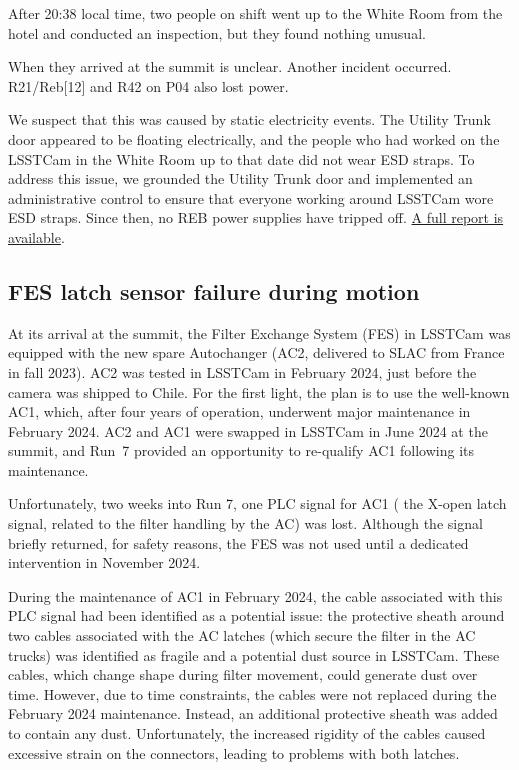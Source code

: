 After 20:38 local time, two people on shift went up to the White Room from the hotel and conducted an inspection, but they found nothing unusual.

When they arrived at the summit is unclear. Another incident occurred. R21/Reb[12] and R42 on P04 also lost power.

We suspect that this was caused by static electricity events. The Utility Trunk door appeared to be floating electrically, and the people who had worked on the LSSTCam in the White Room up to that date did not wear ESD straps. To address this issue, we grounded the Utility Trunk door and implemented an administrative control to ensure that everyone working around LSSTCam wore ESD straps. Since then, no REB power supplies have tripped off.
\href{https://rubinobs.atlassian.net/wiki/spaces/CAM/pages/69763079/REB+trip+off+issue+08+29+24}{A full report is available}.

\clearpage
\subsection{FES latch sensor failure during motion}\label{sec:feslatchissue}
At its arrival at the summit, the Filter Exchange System (FES) in LSSTCam was equipped with the new spare Autochanger (AC2, delivered to SLAC from France in fall 2023). AC2 was  tested in LSSTCam in February 2024, just before the camera was shipped to Chile. For the first light, the plan is to use the well-known AC1, which, after four years of operation, underwent major maintenance in February 2024.  AC2 and AC1 were swapped in LSSTCam in June 2024 at the summit, and Run~7 provided an opportunity to re-qualify AC1 following its maintenance.


Unfortunately, two weeks into Run 7, one PLC signal for AC1 ( the X-open latch signal, related to the filter handling by the AC) was lost. Although the signal briefly returned, for safety reasons, the FES was not used until a dedicated intervention in November 2024.

During the maintenance of AC1 in February 2024, the cable associated with this PLC signal had  been identified as a potential issue:  the protective sheath around two cables associated with the AC latches (which secure the filter in the AC trucks) was identified as fragile and a potential dust source in LSSTCam. These cables, which change shape during filter movement, could generate dust over time. However, due to time constraints, the cables were not replaced during the February 2024 maintenance. Instead, an additional protective sheath was added to contain any dust. Unfortunately, the increased rigidity of the cables caused excessive strain on the connectors, leading to problems with both latches.

